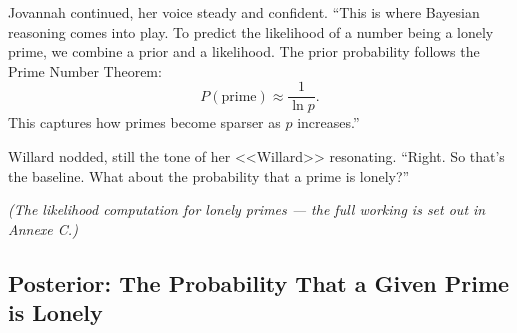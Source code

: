 Jovannah continued, her voice steady and confident. “This is where Bayesian reasoning comes into play. To predict the likelihood of a number being a lonely prime, we combine a prior and a likelihood. The prior probability follows the Prime Number Theorem:
\[
P(\text{prime}) \approx \frac{1}{\ln p}.
\]
This captures how primes become sparser as \( p \) increases.”
\bigskip

Willard nodded, still the tone of her <<Willard>> resonating. “Right. So that’s the baseline. What about the probability that a prime is lonely?”

\textit{(The likelihood computation for lonely primes --- the full working is set out in Annexe C.)}

% 
% 
% 
% 
\subsection{Posterior: The Probability That a Given Prime is Lonely}


